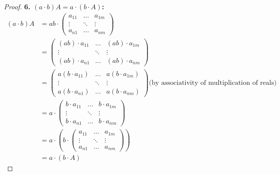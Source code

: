 \documentclass{article}
\begin{document}
\begin{proof}
\textbf{6. $(a \cdot b) A = a \cdot (b \cdot A)$:}
\begin{align*}
(a \cdot b) A &= ab \cdot \begin{pmatrix} a_{11} & \ldots & a_{1m} \\ \vdots &  \ddots & \vdots \\ a_{n1} &  \ldots & a_{nm} \end{pmatrix} \\
&= \begin{pmatrix} (ab) \cdot a_{11} & \ldots & (ab) \cdot a_{1m} \\ \vdots &  \ddots & \vdots \\ (ab) \cdot a_{n1} &  \ldots & (ab) \cdot a_{nm} \end{pmatrix} \\ 
&=  \begin{pmatrix} a(b \cdot a_{11}) & \ldots & a(b \cdot a_{1m}) \\ \vdots &  \ddots & \vdots \\ a(b \cdot a_{n1}) &  \ldots & a(b \cdot a_{nm}) \end{pmatrix} \text{(by associativity of multiplication of reals)}\\
&=  a \cdot \begin{pmatrix} b \cdot a_{11} & \ldots & b \cdot a_{1m} \\ \vdots &  \ddots & \vdots \\ b \cdot a_{n1} &  \ldots & b \cdot a_{nm} \end{pmatrix} \\
&= a \cdot (b \cdot \begin{pmatrix} a_{11} & \ldots & a_{1m} \\ \vdots &  \ddots & \vdots \\ a_{n1} &  \ldots & a_{nm} \end{pmatrix}) \\
&= a \cdot (b \cdot A)
\end{align*}
\smallskip


\end{proof}
\end{document}
